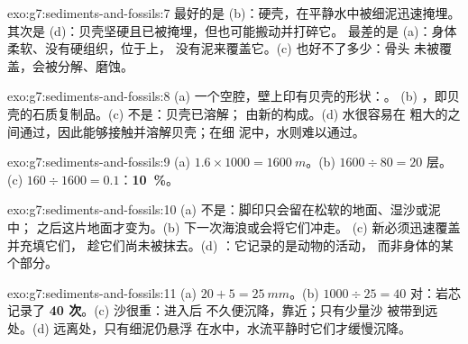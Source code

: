 \begin{solution}{exo:g7:sediments-and-fossils:7}
最好的是 (b)：硬壳，在平静水中被细泥迅速掩埋。
其次是 (d)：贝壳坚硬且已被掩埋，但也可能搬动并打碎它。
最差的是 (a)：身体柔软、没有硬组织，位于上，
没有泥来覆盖它。(c) 也好不了多少：骨头
未被覆盖，会被分解、磨蚀。
\end{solution}

\begin{solution}{exo:g7:sediments-and-fossils:8}
(a) 一个空腔，壁上印有贝壳的形状：。
(b) ，即贝壳的石质复制品。(c) 不是：贝壳已溶解；
由新的构成。(d) 水很容易在
粗大的之间通过，因此能够接触并溶解贝壳；在细
泥中，水则难以通过。
\end{solution}

\begin{solution}{exo:g7:sediments-and-fossils:9}
(a) $1.6 \times 1000 = \qty{1600}{m}$。(b) $1600 \div 80 = 20$ 层。
(c) $160 \div 1600 = 0.1$：\textbf{10~\%}。
\end{solution}

\begin{solution}{exo:g7:sediments-and-fossils:10}
(a) 不是：脚印只会留在松软的地面、湿沙或泥中；
之后这片地面才变为。(b) 下一次海浪或会将它们冲走。
(c) 新必须迅速覆盖并充填它们，
趁它们尚未被抹去。(d) ：它记录的是动物的活动，
而非身体的某个部分。
\end{solution}

\begin{solution}{exo:g7:sediments-and-fossils:11}
(a) $20 + 5 = \qty{25}{mm}$。(b) $1000 \div 25 = 40$ 对：岩芯
记录了 \textbf{40 次}。(c) 沙很重：进入后
不久便沉降，靠近；只有少量沙
被带到远处。(d) 远离处，只有细泥仍悬浮
在水中，水流平静时它们才缓慢沉降。
\end{solution}


